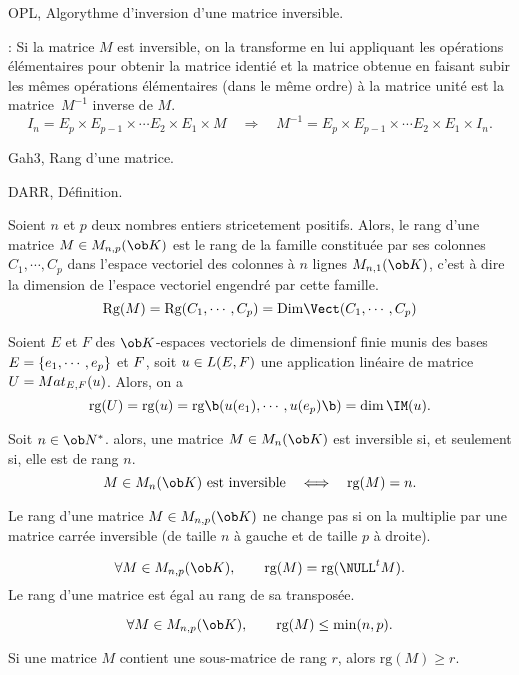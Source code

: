 \Subsection OPL, Algorythme d'inversion d'une matrice inversible.

\Remarque : Si la matrice $M$ est inversible, on la transforme en lui appliquant les opérations élémentaires pour obtenir la matrice identié et la matrice obtenue en faisant subir les mêmes opérations élémentaires (dans le même ordre) à la matrice unité est la matrice~$M^{-1}$ inverse de $M$. 
$$
I_n=E_p\times E_{p-1}\times\cdots E_2\times E_1\times M\quad\Longrightarrow\quad M^{-1}=E_p\times E_{p-1}\times\cdots E_2\times E_1\times I_n.
$$


\Section Gah3, Rang d'une matrice. 


\Subsection DARR, Définition. 

\Definition []  Soient $n$ et $p$ deux nombres entiers stricetement positifs. Alors, le rang d'une matrice $M\in\sc M_{n,p}(\ob K)$ est le rang de la famille constituée par ses colonnes $C_1, \cdots, C_p$ dans l'espace vectoriel des colonnes à $n$ lignes $\sc M_{n,1}(\ob K)$, c'est à dire la dimension de l'espace vectoriel engendré par cette famille.
$$
\mbox{Rg}(M)=\mbox{Rg}(C_1,\cdots, C_p)=\mbox{Dim}\Vect(C_1,\cdots, C_p) 
$$

\Propriete []  Soient $E$ et $F$ des $\ob K$-espaces vectoriels de dimensionf finie munis des bases $\sc E=\{e_1,\cdots,e_p\}$ et $\sc F$, 
soit $u\in\sc L(E,F)$ une application linéaire de matrice $U=\sc Mat_{\sc E,\sc F}(u)$. Alors, on a 
$$
\mbox{rg}(U)=\mbox{rg}(u)=\mbox{rg}\b(u(e_1),\cdots, u(e_p)\b)=\dim\IM(u).
$$

\Propriete []  Soit $n\in\ob N^*$. alors, une matrice $M\in\sc M_n(\ob K)$ est inversible si, et seulement si, elle est de rang $n$. 
$$
M\in\sc M_n(\ob K)\mbox{ est inversible}\quad\Longleftrightarrow\quad \mbox{rg}(M)=n. 
$$

\Propriete []  Le rang d'une matrice $M\in\sc M_{n,p}(\ob K)$ ne change pas si on la multiplie par une matrice carrée inversible (de taille $n$ à gauche et de taille $p$ à droite). 
\bigskip

$$
\forall M\in\sc M_{n,p}(\ob K), \qquad \mbox{rg}(M)=\mbox{rg}(\NULL^tM).
$$
Le rang d'une matrice est égal au rang de sa transposée.

$$
\forall M\in\sc M_{n,p}(\ob K),\qquad \mbox{rg}(M)\le \min(n,p).
$$

\Propriete []  Si une matrice $M$ contient une sous-matrice de rang $r$, alors $\mbox{rg}(M)\ge r$. 
\bigskip

